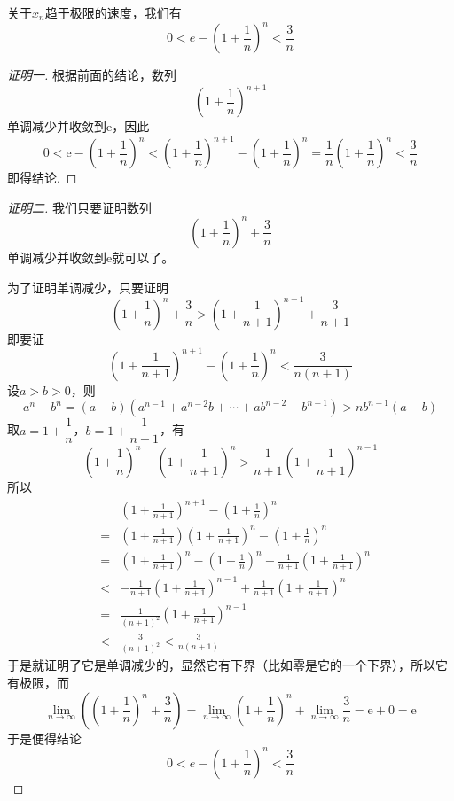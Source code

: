 关于$x_n$趋于极限的速度，我们有
\[ 0 < e-\left( 1 + \frac{1}{n} \right)^n < \frac{3}{n} \]
\begin{proof}[证明一]
  根据前面的结论，数列
  \[ \left( 1+\frac{1}{n} \right)^{n+1} \]
  单调减少并收敛到$\mathrm{e}$，因此
  \[ 0 < \mathrm{e} - \left( 1+\frac{1}{n} \right)^n < \left( 1+\frac{1}{n} \right)^{n+1} - \left( 1+\frac{1}{n} \right)^{n} = \frac{1}{n} \left( 1+\frac{1}{n} \right)^{n} < \frac{3}{n} \]
  即得结论.
\end{proof}

\begin{proof}[证明二]
  我们只要证明数列
  \[ \left( 1 + \frac{1}{n} \right)^n + \frac{3}{n} \]
  单调减少并收敛到$\mathrm{e}$就可以了。

  为了证明单调减少，只要证明
  \[ \left( 1 + \frac{1}{n} \right)^n + \frac{3}{n} > \left( 1 + \frac{1}{n+1} \right)^{n+1} + \frac{3}{n+1} \]
  即要证
  \[ \left( 1 + \frac{1}{n+1} \right)^{n+1} - \left( 1 + \frac{1}{n} \right)^n < \frac{3}{n(n+1)} \]
  设$a>b>0$，则
  \[ a^n-b^n=(a-b)(a^{n-1}+a^{n-2}b+\cdots+ab^{n-2}+b^{n-1})>nb^{n-1}(a-b) \]
  取$a=1+\dfrac{1}{n}$，$b=1+\dfrac{1}{n+1}$，有
  \[ \left( 1 + \frac{1}{n} \right)^{n} - \left( 1 + \frac{1}{n+1} \right)^{n} >\frac{1}{n+1}\left( 1+\frac{1}{n+1} \right)^{n-1} \]
  所以
  \begin{eqnarray*}
    && \left( 1 + \frac{1}{n+1} \right)^{n+1} - \left( 1 + \frac{1}{n} \right)^n \\
    & = & \left( 1 + \frac{1}{n+1} \right)\left( 1 + \frac{1}{n+1} \right)^{n} - \left( 1 + \frac{1}{n} \right)^n \\
    & = & \left( 1 + \frac{1}{n+1} \right)^{n} - \left( 1 + \frac{1}{n} \right)^n + \frac{1}{n+1} \left( 1 + \frac{1}{n+1} \right)^{n} \\
    & < & -\frac{1}{n+1}\left( 1+\frac{1}{n+1} \right)^{n-1} + \frac{1}{n+1} \left( 1 + \frac{1}{n+1} \right)^{n} \\
    & = & \frac{1}{(n+1)^2}\left( 1+\frac{1}{n+1} \right)^{n-1} \\
    & < & \frac{3}{(n+1)^2} < \frac{3}{n(n+1)}
  \end{eqnarray*}
  于是就证明了它是单调减少的，显然它有下界（比如零是它的一个下界），所以它有极限，而
  \[ \lim_{n \to \infty} \left( \left(1+\frac{1}{n} \right)^n + \frac{3}{n} \right) = \lim_{n \to \infty}\left( 1+\frac{1}{n} \right)^n + \lim_{n \to \infty} \frac{3}{n} = \mathrm{e} + 0 = \mathrm{e} \]
    于是便得结论
\[ 0 < e-\left( 1 + \frac{1}{n} \right)^n < \frac{3}{n} \]
\end{proof}

